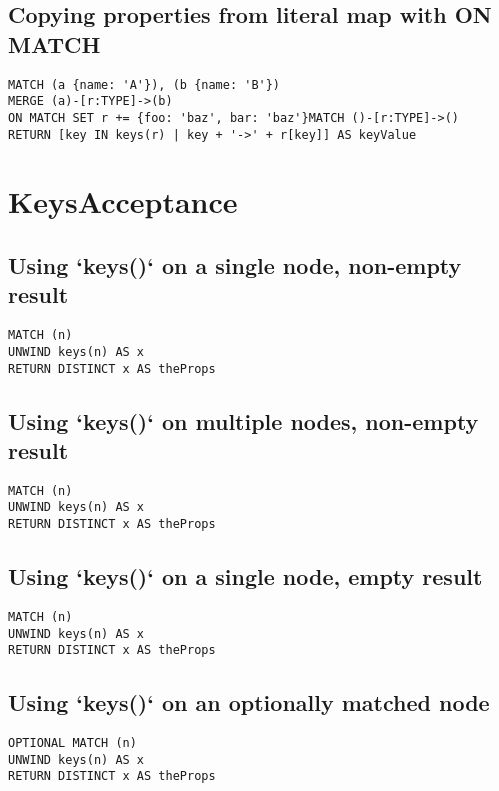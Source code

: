 \subsection{Copying properties from literal map with ON MATCH}

\begin{lstlisting}
MATCH (a {name: 'A'}), (b {name: 'B'})
MERGE (a)-[r:TYPE]->(b)
ON MATCH SET r += {foo: 'baz', bar: 'baz'}MATCH ()-[r:TYPE]->()
RETURN [key IN keys(r) | key + '->' + r[key]] AS keyValue
\end{lstlisting}
\section{KeysAcceptance}


\subsection{Using `keys()` on a single node, non-empty result}

\begin{lstlisting}
MATCH (n)
UNWIND keys(n) AS x
RETURN DISTINCT x AS theProps
\end{lstlisting}

\subsection{Using `keys()` on multiple nodes, non-empty result}

\begin{lstlisting}
MATCH (n)
UNWIND keys(n) AS x
RETURN DISTINCT x AS theProps
\end{lstlisting}

\subsection{Using `keys()` on a single node, empty result}

\begin{lstlisting}
MATCH (n)
UNWIND keys(n) AS x
RETURN DISTINCT x AS theProps
\end{lstlisting}

\subsection{Using `keys()` on an optionally matched node}

\begin{lstlisting}
OPTIONAL MATCH (n)
UNWIND keys(n) AS x
RETURN DISTINCT x AS theProps
\end{lstlisting}

